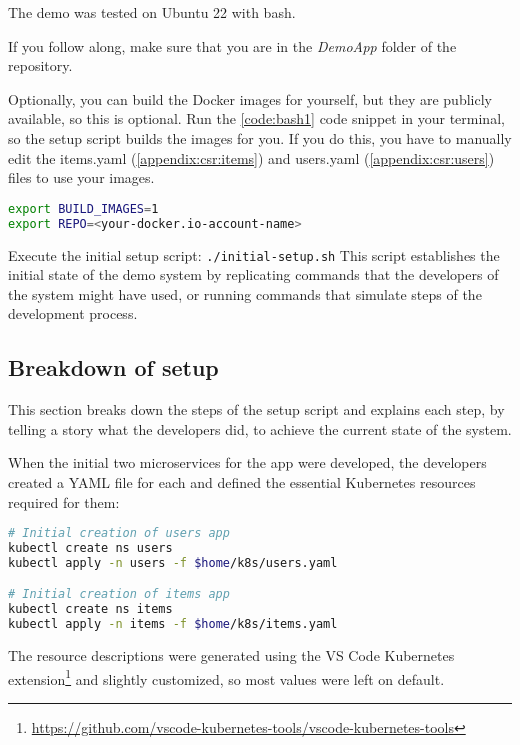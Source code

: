 The demo was tested on Ubuntu 22 with bash.

If you follow along, make sure that you are in the \emph{DemoApp} folder of the repository.

Optionally, you can build the Docker images for yourself, but they are publicly available, so this is optional. Run the \ref{code:bash1} code snippet in your terminal, so the setup script builds the images for you. If you do this, you have to manually edit the items.yaml (\ref{appendix:csr:items}) and users.yaml (\ref{appendix:csr:users}) files to use your images.

\begin{lstlisting}[caption={Optional: Build images},language=bash,label=code:bash1]
export BUILD_IMAGES=1
export REPO=<your-docker.io-account-name>
\end{lstlisting}

Execute the initial setup script: \lstinline|./initial-setup.sh| This script establishes the initial state of the demo system by replicating commands that the developers of the system might have used, or running commands that simulate steps of the development process.

\subsection{Breakdown of setup}

This section breaks down the steps of the setup script and explains each step, by telling a story what the developers did, to achieve the current state of the system.

When the initial two microservices for the app were developed, the developers created a YAML file for each and defined the essential Kubernetes resources required for them:

\begin{lstlisting}[caption={Create first deployment},language=bash,label=code:bash3]
# Initial creation of users app
kubectl create ns users
kubectl apply -n users -f $home/k8s/users.yaml

# Initial creation of items app
kubectl create ns items
kubectl apply -n items -f $home/k8s/items.yaml
\end{lstlisting}

The resource descriptions were generated using the VS Code Kubernetes extension\footnote{\url{https://github.com/vscode-kubernetes-tools/vscode-kubernetes-tools}} and slightly customized, so most values were left on default.

